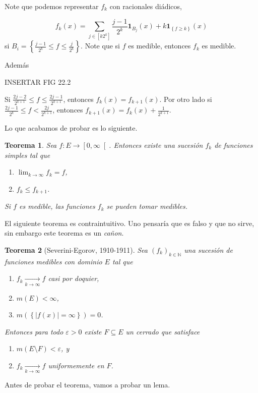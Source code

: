 \documentclass[12pt]{article}
\theoremstyle{plain}
\newtheorem{Th}{Teorema}[subsection]   %
\theoremstyle{definition}
\theoremstyle{remark}
\numberwithin{equation}{section}
\newcommand{\bN}{\mathbb{N}}        %
\renewcommand{\geq}{\geqslant}      %
\renewcommand{\leq}{\leqslant}      %
\renewcommand{\:}{\colon}           %
\newcommand{\conj}[1]{\left\lbrace#1\right\rbrace}
\newcommand{\bonj}[1]{\left\lbrack#1\right\rbrack}
\newcommand{\lbonj}[1]{\left\lbrack#1\right\lbrack}
\begin{document}
\begin{multicols}{2}
Note que podemos representar $f_k$ con racionales diádicos,

$$f_k(x)=\sum_{j\in\bonj{k2^k}}\frac{j-1}{2^k}\mathbf{1}_{B_j}(x)+k\mathbf{1}_{\conj{f\geq k}}(x)$$
si $B_i=\conj{\frac{j-1}{2^k}\leq f\leq\frac{j}{2^k}}$. Note que si $f$ es medible, entonces $f_k$ es medible.\par
Además\par
INSERTAR FIG 22.2\par
Si $\frac{2j-2}{2^{k+1}}\leq f\leq\frac{2j-1}{2^{k+1}}$, entonces $f_k(x)=f_{k+1}(x)$. Por otro lado si $\frac{2j-1}{2^k}\leq f<\frac{2j}{2^{k+1}}$, entonces $f_{k+1}(x)=f_k(x)+\frac{1}{2^{k+1}}$.\par
Lo que acabamos de probar es lo siguiente.

\begin{Th}
  Sea $f\: E\to\lbonj{0,\infty}$. Entonces existe una sucesión $f_k$ de funciones simples tal que
  \begin{enumerate}
    \item $\lim_{k\to\infty}f_k=f$,
    \item $f_k\leq f_{k+1}$.
  \end{enumerate}
  Si $f$ es medible, las funciones $f_k$ se pueden tomar medibles.
\end{Th}

El siguiente teorema es contraintuitivo. Uno pensaría que es falso y que no sirve, sin embargo este teorema es un \emph{cañon}.

\begin{Th}[Severini-Egorov, 1910-1911]\label{thm:Egorov}
  Sea $(f_k)_{k\in\bN}$ una sucesión de funciones medibles con dominio $E$ tal que
  \begin{enumerate}
    \item $f_k\xrightarrow[k\to\infty]{} f$ casi por doquier,
    \item $m(E)<\infty$,
    \item $m(\conj{|f(x)|=\infty})=0$.
  \end{enumerate}
  Entonces para todo $\varepsilon>0$ existe $F\subseteq E$ un cerrado que satisface
  \begin{enumerate}
    \item $m(E\setminus F)<\varepsilon$, y
    \item $f_k\xrightarrow[k\to\infty]{} f$ uniformemente en $F$.
  \end{enumerate}
\end{Th}

Antes de probar el teorema, vamos a probar un lema.


\end{multicols}
\end{document}

